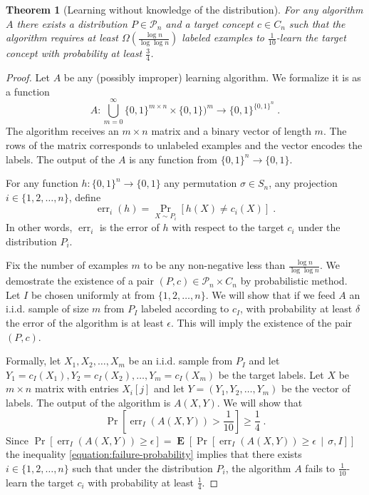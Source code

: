 \documentclass[10pt]{article}
\newtheorem{theorem}[proposition]{Theorem}
\renewcommand{\P}{\mathcal{P}}
\DeclareMathOperator{\err}{err}
\DeclareMathOperator{\Exp}{\mathbf{E}}
\begin{document}
\begin{theorem}[Learning without knowledge of the distribution]
For any algorithm $A$ there exists a distribution $P \in \P_n$ and a target
concept $c \in C_n$ such that the algorithm requires at least  $\Omega \left(
\frac{\log n}{\log \log n} \right)$ labeled examples to $\frac{1}{10}$-learn the
target concept with probability at least $\frac{3}{4}$.
\end{theorem}

\begin{proof}
Let $A$ be any (possibly improper) learning algorithm. We formalize it is as a function
$$
A:\bigcup_{m=0}^\infty\{0,1\}^{m \times n} \times \{0,1\})^m \to \{0,1\}^{\{0,1\}^n} \; .
$$
The algorithm receives an $m \times n$ matrix and a binary vector of length $m$.
The rows of the matrix corresponds to unlabeled examples and the vector encodes
the labels. The output of the $A$ is any function from $\{0,1\}^n \to \{0,1\}$.

For any function $h:\{0,1\}^n \to \{0,1\}$ any permutation $\sigma \in S_n$, any
projection $i \in \{1,2,\dots,n\}$, define
$$
\err_i(h) = \Pr_{X \sim P_i}[h(X) \neq c_i(X)] \; .
$$
In other words, $\err_i$ is the error of $h$ with respect to the target
$c_i$ under the distribution $P_i$.

Fix the number of examples $m$ to be any non-negative less than $\frac{\log
n}{\log \log n}$. We demostrate the existence of a pair $(P,c) \in \P_n \times
C_n$ by probabilistic method. Let $I$ be chosen uniformly at from
$\{1,2,\dots,n\}$. We will show that if we feed $A$ an i.i.d. sample of size $m$
from $P_I$ labeled according to $c_I$, with probability at least $\delta$ the
error of the algorithm is at least $\epsilon$. This will imply the existence of
the pair $(P,c)$.

Formally, let $X_1, X_2, \dots, X_m$ be an i.i.d. sample from $P_I$ and
let $Y_1 = c_I(X_1), Y_2 = c_I(X_2), \dots, Y_m = c_I(X_m)$ be the target
labels. Let $X$ be $m \times n$ matrix with entries $X_i[j]$ and let $Y = (Y_1,
Y_2, \dots, Y_m)$ be the vector of labels. The output of the algorithm is $A(X,Y)$.
We will show that
\begin{equation}
\label{equation:failure-probability}
\Pr \left[\err_I(A(X,Y)) > \frac{1}{10} \right] \ge \frac{1}{4} \; .
\end{equation}
Since $\Pr \left[\err_I(A(X,Y)) \ge \epsilon \right] = \Exp\left[ \Pr \left[\err_I(A(X,Y)) \ge \epsilon \, \middle| \, \sigma, I \right] \right]$
the inequality \eqref{equation:failure-probability} implies that there
exists $i \in \{1,2,\dots,n\}$ such that under the
distribution $P_i$, the algorithm $A$ fails to $\frac{1}{10}$-learn the target
$c_i$ with probability at least $\frac{1}{4}$.


\end{proof}
\end{document}
